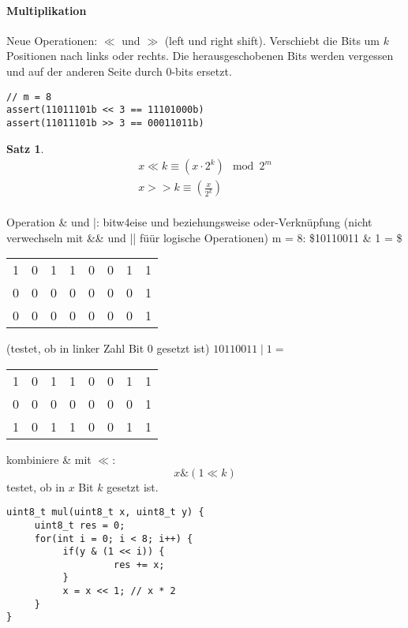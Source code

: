 \documentclass[a4paper]{scrartcl}
\theoremstyle{definition}
\theoremstyle{plain}
\newtheorem{thm}{Satz}
\theoremstyle{remark}
\theoremstyle{remark}
\begin{document}
\paragraph{Multiplikation}
\label{sec-16-1-2-2}
Neue Operationen: $\ll$  und $\gg$ (left und right shift). Verschiebt die Bits um $k$ Positionen nach
links oder rechts. Die herausgeschobenen Bits werden vergessen und auf der anderen Seite durch
$0$-bits ersetzt.

\begin{verbatim}
// m = 8
assert(11011101b << 3 == 11101000b)
assert(11011101b >> 3 == 00011011b)
\end{verbatim}
\begin{thm}
\begin{align*}
x \ll k \equiv (x \cdot 2^k) \mod 2^m \\
x >> k \equiv (\frac{x}{2^k}) \\
\end{align*}
\end{thm}
Operation \& und |: bitw4eise und beziehungsweise oder-Verknüpfung (nicht verwechseln mit \&\& und || füür logische Operationen)
m = 8:
\$10110011 \& 1 = \$
\begin{center}
\begin{tabular}{rrrrrrrr}
1 & 0 & 1 & 1 & 0 & 0 & 1 & 1\\
0 & 0 & 0 & 0 & 0 & 0 & 0 & 1\\
0 & 0 & 0 & 0 & 0 & 0 & 0 & 1\\
\end{tabular}
\end{center}
(testet, ob in linker Zahl Bit 0 gesetzt ist)
$10110011 \mid 1 =$
\begin{center}
\begin{tabular}{rrrrrrrr}
1 & 0 & 1 & 1 & 0 & 0 & 1 & 1\\
0 & 0 & 0 & 0 & 0 & 0 & 0 & 1\\
1 & 0 & 1 & 1 & 0 & 0 & 1 & 1\\
\end{tabular}
\end{center}
kombiniere \& mit $\ll$:
\[x \& (1 \ll k)\]
testet, ob in $x$ Bit $k$ gesetzt ist.
\begin{verbatim}
uint8_t mul(uint8_t x, uint8_t y) {
	 uint8_t res = 0;
	 for(int i = 0; i < 8; i++) {
		  if(y & (1 << i)) {
			       res += x;
		  }
		  x = x << 1; // x * 2
	 }
}
\end{verbatim}
\end{document}
